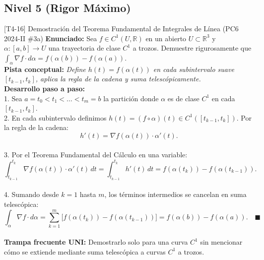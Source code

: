 \documentclass[11pt,a4paper]{article}
\begin{document}
\subsection{Nivel 5 (Rigor Máximo)}

\begin{ejerciciobox}{[T4-16] Demostración del Teorema Fundamental de Integrales de Línea (PC6 2024-II \#3a)}
\textbf{Enunciado:} Sea $f \in C^1(U, \mathbb{R})$ en un abierto $U \subset \mathbb{R}^3$ y $\alpha:[a,b]\to U$ una trayectoria de clase $C^1$ a trozos. Demuestre rigurosamente que $\int_\alpha \nabla f\cdot d\alpha = f(\alpha(b)) - f(\alpha(a))$.\\[0.2cm]
\textbf{Pista conceptual:} \emph{Define $h(t) = f(\alpha(t))$ en cada subintervalo suave $[t_{k-1}, t_k]$, aplica la regla de la cadena y suma telescópicamente.}\\[0.2cm]
\textbf{Desarrollo paso a paso:}\\
1. Sea $a = t_0 < t_1 < \dots < t_m = b$ la partición donde $\alpha$ es de clase $C^1$ en cada $[t_{k-1}, t_k]$.\\
2. En cada subintervalo definimos $h(t) = (f \circ \alpha)(t) \in C^1([t_{k-1}, t_k])$. Por la regla de la cadena:\\
$$h'(t) = \nabla f(\alpha(t)) \cdot \alpha'(t).$$\\
3. Por el Teorema Fundamental del Cálculo en una variable:\\
$$\int_{t_{k-1}}^{t_k} \nabla f(\alpha(t))\cdot\alpha'(t)\,dt = \int_{t_{k-1}}^{t_k} h'(t)\,dt = f(\alpha(t_k)) - f(\alpha(t_{k-1})).$$\\
4. Sumando desde $k = 1$ hasta $m$, los términos intermedios se cancelan en suma telescópica:\\
$$\int_\alpha \nabla f\cdot d\alpha = \sum_{k=1}^m \big[f(\alpha(t_k)) - f(\alpha(t_{k-1}))\big] = f(\alpha(b)) - f(\alpha(a)). \quad \blacksquare$$\\[0.2cm]
\textbf{Trampa frecuente UNI:} Demostrarlo solo para una curva $C^1$ sin mencionar cómo se extiende mediante suma telescópica a curvas $C^1$ a trozos.
\end{ejerciciobox}
\end{document}
